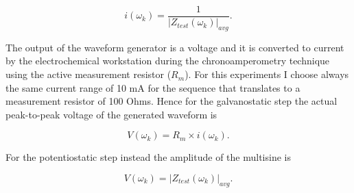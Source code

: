 $$
i(\omega_k) = \frac{1}{|Z_{test}(\omega_k)|_{avg}}.
$$

The output of the waveform generator is a voltage and it is converted to current by the electrochemical workstation during the chronoamperometry technique using the active measurement resistor ($R_m$). 
For this experiments I choose always the same current range of 10 mA for the sequence that translates to a measurement resistor of 100 Ohms. 
Hence for the galvanostatic step the actual peak-to-peak voltage of the generated waveform is 

$$
V(\omega_k) = R_m \times i(\omega_k).
$$

For the potentiostatic step instead the amplitude of the multisine is 

$$
V(\omega_k) = |Z_{test}(\omega_k)|_{avg}.
$$





